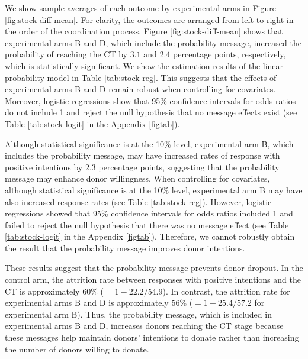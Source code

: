 \documentclass [12pt, a4paper]{article}
\begin{document}
We show sample averages of each outcome by experimental arms in Figure \ref{fig:stock-diff-mean}. For clarity, the outcomes are arranged from left to right in the order of the coordination process. Figure \ref{fig:stock-diff-mean} shows that experimental arms B and D, which include the probability message, increased the probability of reaching the CT by \(3.1\) and \(2.4\) percentage points, respectively, which is statistically significant. We show the estimation results of the linear probability model in Table \ref{tab:stock-reg}. This suggests that the effects of experimental arms B and D remain robust when controlling for covariates. Moreover, logistic regressions show that 95\% confidence intervals for odds ratios do not include 1 and reject the null hypothesis that no message effects exist (see Table \ref{tab:stock-logit} in the Appendix \ref{figtab}).

Although statistical significance is at the 10\% level, experimental arm B, which includes the probability message, may have increased rates of response with positive intentions by \(2.3\) percentage points, suggesting that the probability message may enhance donor willingness. When controlling for covariates, although statistical significance is at the 10\% level, experimental arm B may have also increased response rates (see Table \ref{tab:stock-reg}). However, logistic regressions showed that 95\% confidence intervals for odds ratios included 1 and failed to reject the null hypothesis that there was no message effect (see Table \ref{tab:stock-logit} in the Appendix \ref{figtab}). Therefore, we cannot robustly obtain the result that the probability message improves donor intentions.

These results suggest that the probability message prevents donor dropout. In the control arm, the attrition rate between responses with positive intentions and the CT is approximately 60\% (\(=1 - 22.2/54.9\)). In contrast, the attrition rate for experimental arms B and D is approximately 56\% (\(=1 - 25.4/57.2\) for experimental arm B). Thus, the probability message, which is included in experimental arms B and D, increases donors reaching the CT stage because these messages help maintain donors' intentions to donate rather than increasing the number of donors willing to donate.
\end{document}
